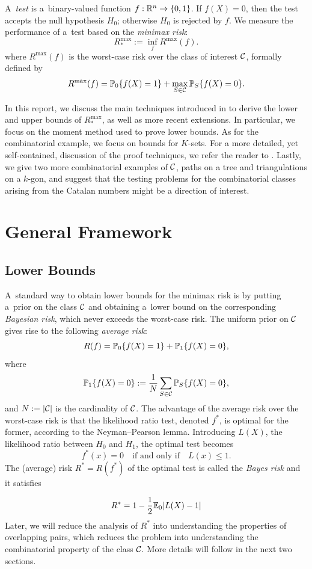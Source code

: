 \documentclass[10pt, oneside]{article}
\begin{document}
A~\textit{test} is a~binary-valued function $f:{\mathbb R}^n \to\{
0,1\}$. If
$f(X)=0$, then the test accepts the null hypothesis $H_0$;
otherwise $H_0$ is rejected by $f$.
We measure the performance of a~test based on the \textit{minimax risk}:
\[
R_*^{\max} := \inf_{f} R^{\max}(f).
\]
where $R^{\max}(f)$ is the worst-case risk over the class of interest ${\mathcal C}$, formally defined by
\[
R^{\max}(f) = \mathbb{P}_0\{f(X)=1\}
+ \max_{S\in{\mathcal C}} \mathbb{P}_S\{f(X)=0\}.
\]

In this report, we discuss the main techniques introduced in \cite{arias2012correlation, addario2010combinatorial, arias2011detection} to derive the lower and upper bounds of $R_*^{\max}$, as well as more recent extensions. In particular, we focus on the moment method used to prove lower bounds. As for the combinatorial example, we focus on bounds for $K$-sets. For a more detailed, yet self-contained, discussion of the proof techniques, we refer the reader to \cite{lugosi2017lectures}.
Lastly, we give two more combinatorial examples of ${\mathcal C}$, paths on a tree and triangulations on a $k$-gon, and suggest that the testing problems for the combinatorial classes arising from the Catalan numbers might be a direction of interest.
\section{General Framework}

\subsection{Lower Bounds}
A~standard way to obtain lower bounds for the minimax risk is by putting a~prior on the class ${\mathcal C}$ and obtaining a~lower bound on the corresponding \textit{Bayesian risk}, which never exceeds the worst-case risk. The
uniform prior on ${\mathcal C}$ gives rise to the following \textit{average risk}:
\[
R(f) = \mathbb{P}_0\{f(X)=1\}
+ \mathbb{P}_1\{f(X)=0\},
\]
where
\[
\mathbb{P}_1\{f(X)=0\} := \frac{1}{N}\sum_{S\in{\mathcal C}} \mathbb{P}_S\{f(X)=0\},
\]
and $N := |{\mathcal C}|$ is the cardinality of ${\mathcal C}$.
The advantage of the average risk over the worst-case risk is that the likelihood ratio test, denoted $f^*$, is optimal for the former, according to the Neyman--Pearson lemma. Introducing $L(X)$, the likelihood ratio between $H_0$ and $H_1$, the optimal test becomes
%
\[
f^*(x) = 0  \quad\mbox{if and only if}\quad   L(x) \le 1.
\]
The
(average)
risk $R^*=R(f^*)$ of the optimal test is called the
\textit{Bayes risk} and it satisfies

\[
R^* = 1 - \frac{1}{2} \mathbb{E}_0 |L(X) - 1|
\]
Later, we will reduce the analysis of $R^*$ into understanding the properties of overlapping pairs, which reduces the problem into understanding the combinatorial property of the class ${\mathcal C}.$ More details will follow in the next two sections.
\end{document}

